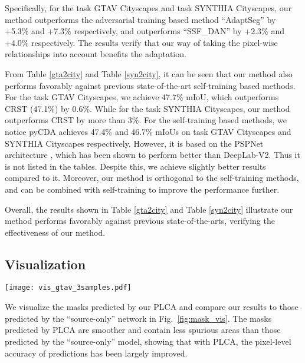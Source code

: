 Specifically,  
for the task GTAV  Cityscapes and
task SYNTHIA  Cityscapes,
our method outperforms the adversarial training based method ``AdaptSeg''
by +5.3\% and +7.3\% respectively, and outperforms ``SSF\_DAN'' by +2.3\% and +4.0\% respectively.
The results verify that our way of taking the pixel-wise relationships into account benefits the adaptation.

From Table \ref{gta2city} and Table \ref{syn2city}, 
it can be seen that our method also performs favorably against previous 
state-of-the-art self-training based methods.
For the task GTAV  Cityscapes, 
we achieve 47.7\% mIoU, 
which outperforms CRST (47.1\%) by 0.6\%.
While for the task SYNTHIA  Cityscapes,
our method outperforms CRST by more than 3\%. For the self-training based methods, we notice pyCDA \cite{lian2019constructing} achieves 47.4\% and 46.7\% mIoUs on 
task GTAV  Cityscapes and SYNTHIA  Cityscapes
respectively.
However, it is based on the PSPNet architecture \cite{zhao2017pyramid}, 
which has been shown \cite{zhao2017pyramid,chen2018road} to perform 
 better than DeepLab-V2.
Thus it is not listed in the tables.
Despite this, we achieve slightly better results compared to it.
Moreover, our method is orthogonal to the self-training methods, 
and can be combined with self-training to improve the 
performance further. 


Overall, the results shown in Table \ref{gta2city} and Table \ref{syn2city} illustrate our method 
performs favorably against previous
state-of-the-arts, verifying the effectiveness of our method.

\subsection{Visualization}
\begin{figure*}[t]
\begin{center}
\texttt{[image: vis\_gtav\_3samples.pdf]}
\end{center}
\caption{\label{fig:mask_vis}
Visualization of predicted segmentation masks on the test images of Cityscapes.
From the left to the right, the original image, the ground-truth 
segmentation mask, the mask predicted by ``source-only'' network, and
the mask predicted by our PLCA are shown one by one.
Both of the ``source-only'' network and PLCA are trained with GTAV as the source.
}
\end{figure*}

We visualize the masks predicted by our PLCA and compare 
our results to those predicted by the ``source-only'' network in Fig.~\ref{fig:mask_vis}.
The masks predicted by PLCA are smoother
and contain less spurious areas than those predicted by 
the ``source-only'' model,
showing that with PLCA, the pixel-level accuracy of predictions
has been largely improved.
